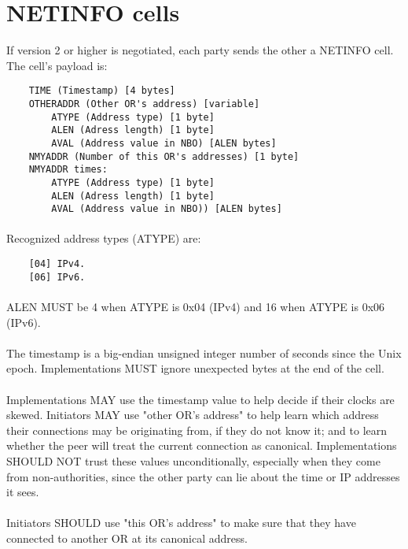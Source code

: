 \section{NETINFO cells}

If version 2 or higher is negotiated, each party sends the other a
NETINFO cell. The cell's payload is:

\begin{verbatim}
    TIME (Timestamp) [4 bytes]
    OTHERADDR (Other OR's address) [variable]
        ATYPE (Address type) [1 byte]
        ALEN (Adress length) [1 byte]
        AVAL (Address value in NBO) [ALEN bytes]
    NMYADDR (Number of this OR's addresses) [1 byte]
    NMYADDR times:
        ATYPE (Address type) [1 byte]
        ALEN (Adress length) [1 byte]
        AVAL (Address value in NBO)) [ALEN bytes]
\end{verbatim}

\paragraph{}
Recognized address types (ATYPE) are:
\begin{verbatim}
    [04] IPv4.
    [06] IPv6.
\end{verbatim}

\paragraph{}
ALEN MUST be 4 when ATYPE is 0x04 (IPv4) and 16 when ATYPE is 0x06
(IPv6).

\paragraph{}
The timestamp is a big-endian unsigned integer number of seconds
since the Unix epoch. Implementations MUST ignore unexpected bytes
at the end of the cell.

\paragraph{}
Implementations MAY use the timestamp value to help decide if their
clocks are skewed. Initiators MAY use "other OR's address" to help
learn which address their connections may be originating from, if they do
not know it; and to learn whether the peer will treat the current
connection as canonical. Implementations SHOULD NOT trust these
values unconditionally, especially when they come from non-authorities,
since the other party can lie about the time or IP addresses it sees.

\paragraph{}
Initiators SHOULD use "this OR's address" to make sure
that they have connected to another OR at its canonical address.
